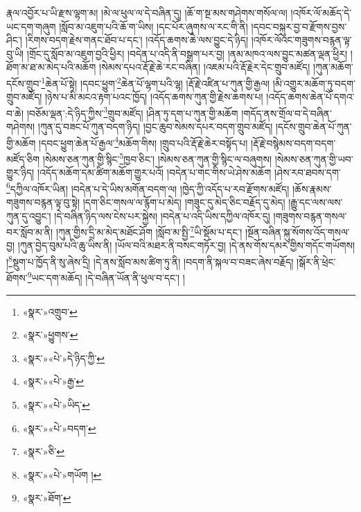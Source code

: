 རྣལ་འབྱོར་པ་ཡི་རྫས་ལྷག་མ། །མེ་ལ་ཕུལ་ལ་དེ་བཞིན་དུ། །ཆོ་ག་སྔ་མས་གཤེགས་གསོལ་ལ། །འཁོར་ལོ་མཆོད་དེ་ཡང་དག་གཞུག །སློབ་མ་འཇུག་པའི་ཆོ་ག་ཡིས། །དང་པོར་ཞུགས་ལ་རང་གི་ནི། །དབང་བསྐུར་བྱ་བ་རྫོགས་བྱས་ཤིང་། །རིགས་བདག་རྗེས་གནང་ཐོབ་པ་དང་། །འདོད་ཆགས་ཆེ་ལས་བྱུང་དེ་ཉིད། །འཁོར་ལོའང་གཟུགས་བརྙན་ལྟ་བུ་ཡི། །གྲོང་དུ་སློབ་མ་འཇུག་བྱའི་ཕྱིར། །བདེན་པ་འདི་ནི་བསྒྲག་པར་བྱ། །ནམ་མཁའ་ལས་བྱུང་མཚན་ལྡན་ཕྱིར། །ཐོག་མ་ཐ་མ་མེད་པའི་མཆོག །སེམས་དཔའ་རྡོ་རྗེ་ཆེ་རང་བཞིན། །འཇམ་པའི་རྡོ་རྗེར་དེང་གྲུབ་མཛོད། །ཀུན་མཆོག་དངོས་གྲུབ་\footnote{«སྣར་»འགྲུབ་}ཆེན་པོ་སྟེ། །དབང་ཕྱུག་\footnote{«སྣར་»ཕྱུགས་}ཆེན་པོ་ལྷག་པའི་ལྷ། །རྡོ་རྗེ་འཛིན་པ་ཀུན་གྱི་རྒྱལ། །མི་འགྱུར་མཆོག་ཏུ་བདག་གྲུབ་མཛོད། །ཉེས་པ་མི་མངའ་རྟག་པའང་ཁྱོད། །འདོད་ཆགས་ཀུན་གྱི་རྗེས་ཆགས་པ། །འདོད་ཆགས་ཆེན་པོ་དགའ་བ་ཆེ། །བཅོམ་ལྡན་:དེ་ཉིད་ཀྱིས་\footnote{«སྣར་»«པེ་»དེ་ཉིད་ཀྱི་}གྲུབ་མཛོད། །ཤིན་ཏུ་དག་པ་ཀུན་གྱི་མཆོག །གདོད་ནས་གྲོལ་བ་དེ་བཞིན་གཤེགས། །ཀུན་དུ་བཟང་པོ་ཀུན་བདག་ཉིད། །བྱང་ཆུབ་སེམས་དཔར་བདག་གྲུབ་མཛོད། །དངོས་གྲུབ་ཆེན་པོ་ཀུན་གྱི་མཆོག །དབང་ཕྱུག་ཆེན་པོ་རྒྱལ་\footnote{«སྣར་»«པེ་»རྒྱ་}མཆོག་གིས། །གྲུབ་པའི་རྡོ་རྗེ་ཆེར་བསྟོད་པ། །རྡོ་རྗེ་བསྙེམས་བདག་བདག་མཛོད་ཅིག །སེམས་ཅན་ཀུན་གྱི་སྙིང་\footnote{«སྣར་»«པེ་»ཡིད་}ཁྱབ་ཅིང་། །སེམས་ཅན་ཀུན་གྱི་སྙིང་ལ་བཞུགས། །སེམས་ཅན་ཀུན་གྱི་ཡབ་གྱུར་ཉིད། །འདོད་མཆོག་དམ་ཚིག་མཆོག་གྱུར་པའོ། །བདེན་པ་གང་གིས་ཡེ་ཤེས་མཆོག །ཤེས་རབ་ཐབས་དག་\footnote{«སྣར་»«པེ་»བདག་}དཀྱིལ་འཁོར་ཡིན། །བདེན་པ་དེ་ཡིས་མགོན་བདག་ལ། །ཁྱེད་ཀྱི་འདོད་པ་རབ་རྫོགས་མཛོད། །ཆོས་རྣམས་གཟུགས་བརྙན་ལྟ་བུ་སྟེ། །དག་ཅིང་གསལ་ལ་རྙོག་པ་མེད། །གཟུང་དུ་མེད་ཅིང་བརྗོད་དུ་མེད། །རྒྱུ་དང་ལས་ལས་ཀུན་དུ་འབྱུང་། །དེ་བཞིན་ཉིད་ལས་ངེས་པར་སྐྱེས། །བདེན་པ་འདི་ཡིས་དཀྱིལ་འཁོར་དུ། །གཟུགས་བརྙན་གསལ་བར་སློབ་མ་ནི། །ཀུན་གྱིས་དྲི་མ་མེད་མཐོང་ཤོག །སློབ་མ་སྤྱི་\footnote{«སྣར་»ཅི་}ཡི་སྡོམ་པ་དང་། །སྔོན་བཞིན་སྐུ་སོགས་འོད་གསལ་བྱ། །ཀུན་བྱེད་བུམ་པའི་ཆུ་ཡིས་ནི། །ཡོལ་བའི་མཐར་ནི་བསང་གཏོར་བྱ། །དེ་ནས་གོས་དམར་གྱིས་གདོང་གཡོགས། །\footnote{«སྣར་»«པེ་»གཡོག །}སྡུག་པ་ཁྱོད་ནི་སུ་ཞེས་དྲི། །དེ་ནས་སློབ་མས་ཚིག་ཏུ་ནི། །བདག་ནི་སྐལ་བ་བཟང་ཞེས་བརྗོད། །སྒོར་ནི་ཕྲེང་ཐོགས་\footnote{«སྣར་»ཐོག་}ཡང་དག་མཆོད། །དེ་བཞིན་ཡོན་ནི་ཕུལ་བ་དང་། །
